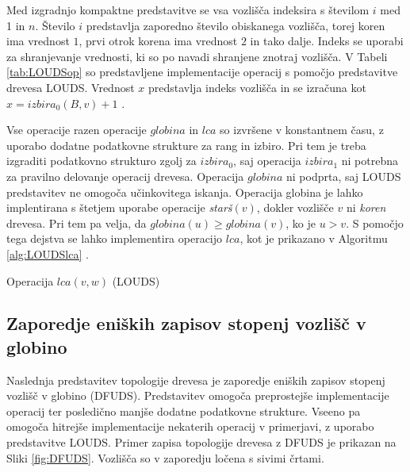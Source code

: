 Med izgradnjo kompaktne predstavitve se vsa vozlišča indeksira s številom $i$ med 1 in $n$. Število $i$ predstavlja zaporedno število obiskanega vozlišča, torej koren ima vrednost $1$, prvi otrok korena ima vrednost $2$ in tako dalje. Indeks se uporabi za shranjevanje vrednosti, ki so po navadi shranjene znotraj vozlišča. V Tabeli \ref{tab:LOUDSop} so predstavljene implementacije operacij s pomočjo predstavitve drevesa LOUDS. Vrednost $x$ predstavlja indeks vozlišča in se izračuna kot $x=izbira_0(B,v)+1$ \cite{Navarro2016}.


Vse operacije razen operacije $globina$ in $lca$ so izvršene v konstantnem času, z uporabo dodatne podatkovne strukture za rang in izbiro. Pri tem je treba izgraditi podatkovno strukturo zgolj za $izbira_0$, saj operacija $izbira_1$ ni potrebna za pravilno delovanje operacij drevesa. Operacija $globina$ ni podprta, saj LOUDS predstavitev ne omogoča učinkovitega iskanja. Operacija globina je lahko implentirana s štetjem uporabe operacije \textit{starš}$(v)$, dokler vozlišče $v$ ni \textit{koren} drevesa. Pri tem pa velja, da $globina(u)\ge globina(v)$, ko je $u>v$. S pomočjo tega dejstva se lahko implementira operacijo $lca$, kot je prikazano v Algoritmu \ref{alg:LOUDSlca} \cite{Navarro2016}.
 
\begin{algorithm}[hbt]

\caption{Operacija $lca(v,w)$ (LOUDS)}\label{alg:LOUDSlca}
{
    
}
\end{algorithm}

\newpage

\subsection{Zaporedje eniških zapisov stopenj vozlišč v globino}\label{sec:DFUDS}

Naslednja predstavitev topologije drevesa je zaporedje eniških zapisov stopenj vozlišč v globino (DFUDS). Predstavitev omogoča preprostejše implementacije operacij ter posledično manjše dodatne podatkovne strukture. Vseeno pa omogoča hitrejše implementacije nekaterih operacij v primerjavi, z uporabo predstavitve LOUDS. Primer zapisa topologije drevesa z DFUDS je prikazan na Sliki \ref{fig:DFUDS}. Vozlišča so v zaporedju ločena s sivimi črtami.

